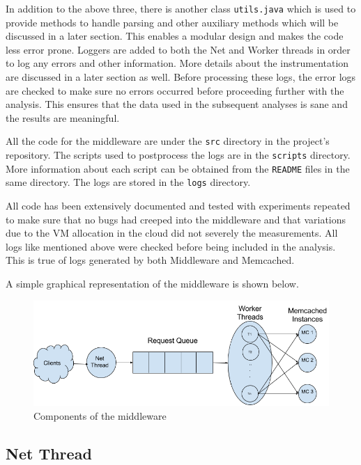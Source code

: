 \documentclass[11pt,a4paper]{article}
\begin{document}
In addition to the above three, there is another class \texttt{utils.java} which is used to provide methods to handle parsing and other auxiliary methods which will be discussed in a later section. This enables a modular design and makes the code less error prone. Loggers are added to both the Net and Worker threads in order to log any errors and other information. More details about the instrumentation are discussed in a later section as well. Before processing these logs, the error logs are checked to make sure no errors occurred before proceeding further with the analysis. This ensures that the data used in the subsequent analyses is sane and the results are meaningful. 

All the code for the middleware are under the \texttt{src} directory in the project’s repository. The scripts used to postprocess the logs are in the \texttt{scripts} directory. More information about each script can be obtained from the \texttt{README} files in the same directory. The logs are stored in the \texttt{logs} directory.

All code has been extensively documented and tested with experiments repeated to make sure that no bugs had creeped into the middleware and that variations due to the VM allocation in the cloud did not severely the measurements. All logs like mentioned above were checked before being included in the analysis. This is true of logs generated by both Middleware and Memcached.

A simple graphical representation of the middleware is shown below.
	\begin{figure}[h]
		\caption{Components of the middleware}
		\centering
		\includegraphics[scale=0.525]{images/1_MW_simple.png}
	\end{figure}

\subsection{Net Thread}
\end{document}
